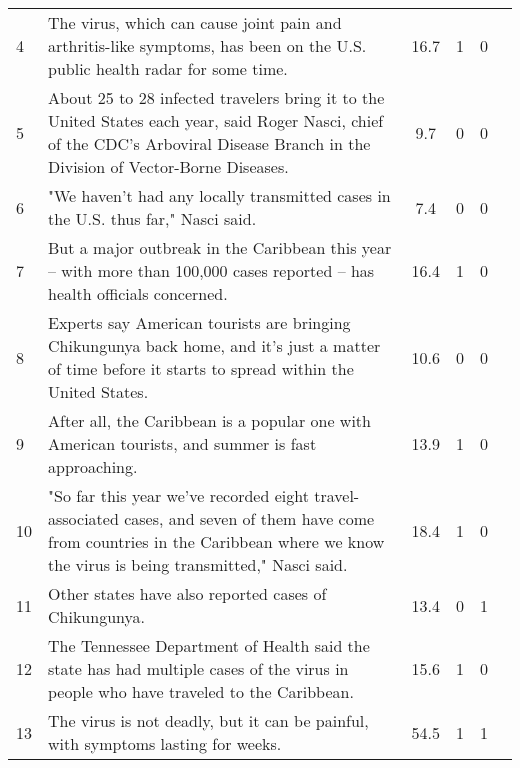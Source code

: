 \documentclass[11pt,a4paper]{article}
\begin{document}
\begin{table*}[t!]
{\begin{tabular}{| l | p{9.6cm} | c | c | c || r |}
    4 & The virus, which can cause joint pain and arthritis-like
    symptoms, has been on the U.S. public health radar for some
    time. & 16.7 & 1 & 0 & \\

    5 & About 25 to 28 infected travelers bring it to the United
    States each year, said Roger Nasci, chief of the CDC's Arboviral
    Disease Branch in the Division of Vector-Borne Diseases. & 9.7 & 0
    & 0 & \\

    6 & "We haven't had any locally transmitted cases in the U.S. thus
    far," Nasci said. & 7.4 & 0 & 0 & \\

    7 & But a major outbreak in the Caribbean this year -- with more
    than 100,000 cases reported -- has health officials concerned. &
    16.4 & 1 & 0 & \\

    8 & Experts say American tourists are bringing Chikungunya back
    home, and it's just a matter of time before it starts to spread
    within the United States. & 10.6 & 0 & 0 & \\

    9 & After all, the Caribbean is a popular one with American
    tourists, and summer is fast approaching. & 13.9 & 1 & 0 & \\

    10 & "So far this year we've recorded eight travel-associated
    cases, and seven of them have come from countries in the Caribbean
    where we know the virus is being transmitted," Nasci said. & 18.4
    & 1 & 0 & \\

    11 & Other states have also reported cases of Chikungunya. & 13.4 &
    0 & 1 & \\

    12 & The Tennessee Department of Health said the state has had
    multiple cases of the virus in people who have traveled to the
    Caribbean. & 15.6 & 1 & 0 & \\
    
    13 & The virus is not deadly, but it can be painful, with symptoms
    lasting for weeks. & 54.5 & 1 & 1 & \\
    

\end{tabular}}
\end{table*}
\end{document}
